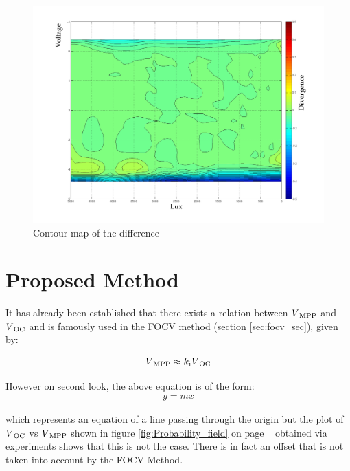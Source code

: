 \begin{figure}[H]
  \begin{center}
	  \includegraphics[width=\textwidth]{images/Contour_map}
	  \caption{Contour map of the difference}
	  \label{fig:Contour_map}
  \end{center}
\end{figure}

\section{Proposed Method } \label{sec:proposed_algo_sec}

It has already been established that there exists a relation between $V\textsubscript{MPP}$ and $V\textsubscript{OC}$ and is famously used in the \ac{FOCV} method (section \ref{sec:focv_sec}), given by:

  \begin{equation}
   \begin{aligned}
	  V\textsubscript{MPP}\approx k\textsubscript{i}V\textsubscript{OC}
	  \label{eq:equ_fracoc_proposed}
  \end{aligned}
  \end{equation}  
  
However on second look, the above equation is of the form:
  \begin{equation}
     \begin{aligned}
  	 y = mx
  	  \label{eq:equ_line}
    \end{aligned}
    \end{equation}  
    
which represents an equation of a line passing through the origin but the plot of $V\textsubscript{OC}$ vs $V\textsubscript{MPP}$ shown in figure \ref{fig:Probability_field} on page ~\pageref{fig:Probability_field} obtained via experiments shows that this is not the case. There is in fact an offset that is not taken into account by the \ac{FOCV} Method.\\

